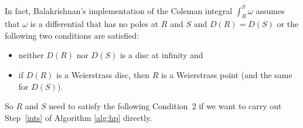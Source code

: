 \documentclass[11pt, a4paper]{amsart}
\theoremstyle{remark}
\numberwithin{equation}{section}
\newcommand{\sm}{{}}
\begin{document}
In fact, Balakrishnan's implementation of the Coleman integral 
   $\int_{R}^{S} \omega$ assumes that
    $\omega$ is a differential that has no poles at $R$ and $S$ and
    $D(R)= D(S)$ or the following two conditions are satisfied:
\begin{itemize}
\item[(a)] neither $D(R)$ nor $D(S)$  is a disc at infinity and
\item[(b)] if $D(R)$  is a  Weierstrass disc, then $R$ is a  Weierstrass point
  (and the same for $D(S)$).
\end{itemize} 
   So $R$ and $S$ need to satisfy the following Condition~2 if we want to carry out Step~\eqref{ints} of Algorithm \ref{alg:hp} directly. 
\end{document}
